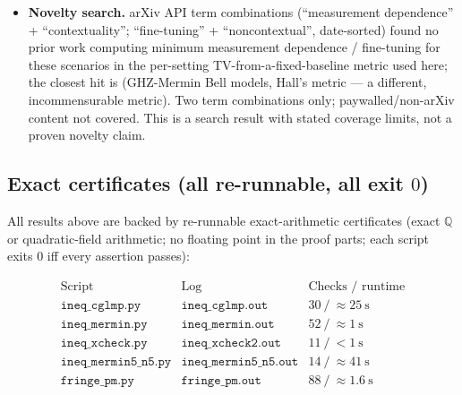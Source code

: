 \documentclass[aps,pra,reprint,superscriptaddress,floatfix]{revtex4-2}
\begin{document}
\begin{itemize}
  \cite{cabello2008} has a quantum value strictly between the NC bound
  and the algebraic maximum --- the true analog of $2\sqrt{2}$ vs $4$. The
  same two-lemma machinery applies (five contexts, binary outcomes,
  parity-type obstruction); the exact constants (NC bound of
  $\cos^{2}(\pi/10)$ type) must be taken from \cite{cabello2008} before
  use and were \emph{not} verified in this work.
\item \textbf{Novelty search.} {arXiv} API term combinations
  (``measurement dependence'' + ``contextuality''; ``fine-tuning'' +
  ``noncontextual'', date-sorted) found no prior work computing minimum
  measurement dependence / fine-tuning for these scenarios in the
  per-setting TV-from-a-fixed-baseline metric used here; the closest hit
  is \cite{alai2026b} (GHZ-{Mermin} Bell models, Hall's metric --- a
  different, incommensurable metric). Two term combinations only;
  paywalled/non-{arXiv} content not covered. This is a search result with
  stated coverage limits, not a proven novelty claim.
\end{itemize}

\subsection{Exact certificates (all re-runnable, all exit $0$)}

All results above are backed by re-runnable exact-arithmetic certificates
(exact $\mathbb{Q}$ or quadratic-field arithmetic; no floating point in
the proof parts; each script exits $0$ iff every assertion passes):

\footnotesize
\begin{equation*}
\begin{array}{l|l|l}
\text{Script} & \text{Log} & \text{Checks / runtime}\\
\hline
\texttt{ineq\_cglmp.py} & \texttt{ineq\_cglmp.out} & 30\ /\ \approx 25\ \mathrm{s}\\
\texttt{ineq\_mermin.py} & \texttt{ineq\_mermin.out} & 52\ /\ \approx 1\ \mathrm{s}\\
\texttt{ineq\_xcheck.py} & \texttt{ineq\_xcheck2.out} & 11\ /\ <1\ \mathrm{s}\\
\texttt{ineq\_mermin5\_n5.py} & \texttt{ineq\_mermin5\_n5.out} & 14\ /\ \approx 41\ \mathrm{s}\\
\texttt{fringe\_pm.py} & \texttt{fringe\_pm.out} & 88\ /\ \approx 1.6\ \mathrm{s}
\end{array}
\end{equation*}
\normalsize
\end{document}
